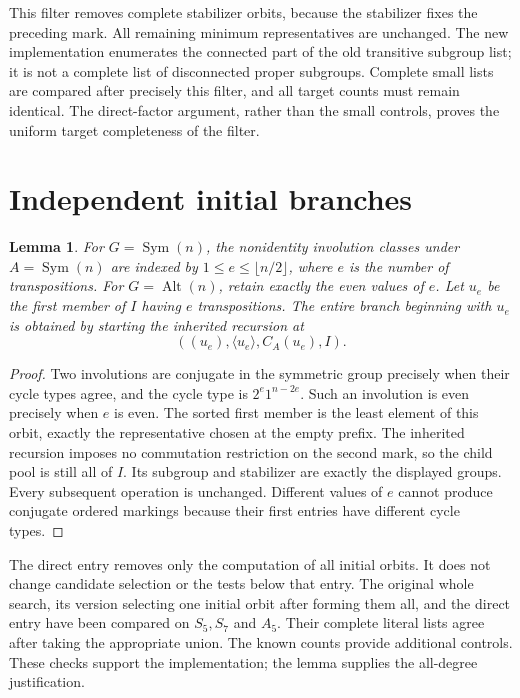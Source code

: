 \documentclass[11pt,a4paper]{article}
\newtheorem{lemma}{Lemma}
\newcommand{\Sym}{\operatorname{Sym}}
\newcommand{\Alt}{\operatorname{Alt}}
\begin{document}
This filter removes complete stabilizer orbits, because the stabilizer
fixes the preceding mark. All remaining minimum representatives are
unchanged. The new implementation enumerates the connected part of the
old transitive subgroup list; it is not a complete list of disconnected
proper subgroups. Complete small lists are compared after precisely this
filter, and all target counts must remain identical. The direct-factor
argument, rather than the small controls, proves the uniform target
completeness of the filter.

\section{Independent initial branches}
\begin{lemma}
For $G=\Sym(n)$, the nonidentity involution classes under $A=\Sym(n)$
are indexed by $1\leq e\leq\lfloor n/2\rfloor$, where $e$ is the number
of transpositions. For $G=\Alt(n)$, retain exactly the even values of $e$.
Let $u_e$ be the first member of $I$ having $e$ transpositions. The entire
branch beginning with $u_e$ is obtained by starting the inherited
recursion at
\[
       ((u_e),\langle u_e\rangle,C_A(u_e),I).
\]
\end{lemma}
\begin{proof}
Two involutions are conjugate in the symmetric group precisely when their
cycle types agree, and the cycle type is $2^e1^{n-2e}$. Such an involution
is even precisely when $e$ is even. The sorted first member is the least
element of this orbit, exactly the representative chosen at the empty
prefix. The inherited recursion imposes no commutation restriction on
the second mark, so the child pool is still all of $I$. Its subgroup and
stabilizer are exactly the displayed groups. Every subsequent operation
is unchanged. Different values of $e$ cannot produce conjugate ordered
markings because their first entries have different cycle types.
\end{proof}

The direct entry removes only the computation of all initial orbits.
It does not change candidate selection or the tests below that entry.
The original whole search, its version selecting one initial orbit after
forming them all, and the direct entry have been compared on $S_5,S_7$
and $A_5$. Their complete literal lists agree after taking the appropriate
union. The known counts provide additional controls. These checks support
the implementation; the lemma supplies the all-degree justification.
\end{document}
